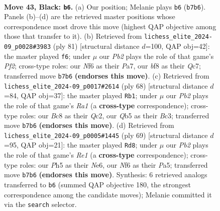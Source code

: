\documentclass[11pt]{article}
\begin{document}
\begin{figure}[p]
\label{fig:thought-m83}
\end{figure}

\clearpage

\begin{figure}[p]\centering
\begin{subfigure}{0.46\textwidth}\centering
\resizebox{\linewidth}{!}{%
\newchessgame
\chessboard[
  setfen={r1b2B1k/ppp2pp1/5n2/1q5p/5P1b/1P2Q2P/P1B3P1/R5K1 b - - 2 43},
  showmover=false,
  pgfstyle=straightmove, color=movearrow, markmove={b7-b6}
]}
\caption{}
\end{subfigure}\hfill
\begin{subfigure}{0.46\textwidth}\centering
\resizebox{\linewidth}{!}{%
\newchessgame
\chessboard[
  setfen={8/p1q2ppk/2P5/3R3p/rP2pPbP/2Q1P1P1/1PK5/6R1 b - - 4 41},
  showmover=false,
  pgfstyle=straightmove, color=movearrow, markmove={f7-f6}
]}
\caption{}
\end{subfigure}
\\[4pt]
\begin{subfigure}{0.46\textwidth}\centering
\resizebox{\linewidth}{!}{%
\newchessgame
\chessboard[
  setfen={r6k/1q4p1/2b2p1p/p1b1p3/2P4N/P1B1P2P/2Q2PP1/R5K1 w - - 4 35},
  showmover=false,
  pgfstyle=straightmove, color=movearrow, markmove={a1-b1}
]}
\caption{}
\end{subfigure}\hfill
\begin{subfigure}{0.46\textwidth}\centering
\resizebox{\linewidth}{!}{%
\newchessgame
\chessboard[
  setfen={4r1k1/4qpp1/1p2n2p/pNb5/P6P/2P2QP1/1P6/2BR3K b - - 0 35},
  showmover=false,
  pgfstyle=straightmove, color=movearrow, markmove={e8-d8}
]}
\caption{}
\end{subfigure}
\caption{\textbf{Move 43, Black: \texttt{b6}.} (a) Our position; Melanie plays \texttt{b6} (\texttt{b7b6}). Panels (b)--(d) are the retrieved master positions whose correspondence most drove this move (highest QAP objective among those that transfer to it). (b) Retrieved from \texttt{lichess\_elite\_2024-09\_p0028\#3983} (ply 81) [structural distance $d$=100, QAP obj=42]: the master played \texttt{f6}; under $\mu$ our \emph{Pb2} plays the role of that game's \emph{Pf2}; cross-type roles: our \emph{N}f6 as their \emph{P}a7, our \emph{b}f8 as their \emph{Q}c7; transferred move \texttt{b7b6} \textbf{(endorses this move)}. (c) Retrieved from \texttt{lichess\_elite\_2024-09\_p0017\#2614} (ply 68) [structural distance $d$=84, QAP obj=37]: the master played \texttt{Rb1}; under $\mu$ our \emph{Pb2} plays the role of that game's \emph{Ra1} (a \textbf{cross-type} correspondence); cross-type roles: our \emph{B}c8 as their \emph{Q}c2, our \emph{Q}b5 as their \emph{B}c3; transferred move \texttt{b7b6} \textbf{(endorses this move)}. (d) Retrieved from \texttt{lichess\_elite\_2024-09\_p0005\#1445} (ply 69) [structural distance $d$=95, QAP obj=21]: the master played \texttt{Rd8}; under $\mu$ our \emph{Pb2} plays the role of that game's \emph{Re1} (a \textbf{cross-type} correspondence); cross-type roles: our \emph{P}h5 as their \emph{N}e6, our \emph{N}f6 as their \emph{P}a5; transferred move \texttt{b7b6} \textbf{(endorses this move)}. Synthesis: 6 retrieved analogs transferred to \texttt{b6} (summed QAP objective 180, the strongest correspondence among the candidate moves); Melanie committed it via the \texttt{search} selector.}

\end{figure}
\end{document}
